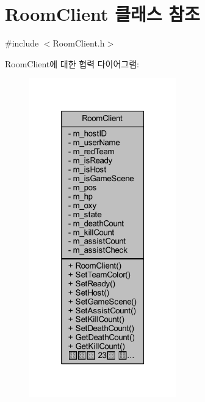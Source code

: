 \hypertarget{class_room_client}{}\section{Room\+Client 클래스 참조}
\label{class_room_client}


{\ttfamily \#include $<$Room\+Client.\+h$>$}



Room\+Client에 대한 협력 다이어그램\+:
\nopagebreak
\begin{figure}[H]
\begin{center}
\leavevmode
\includegraphics[width=181pt]{class_room_client__coll__graph}
\end{center}
\end{figure}
